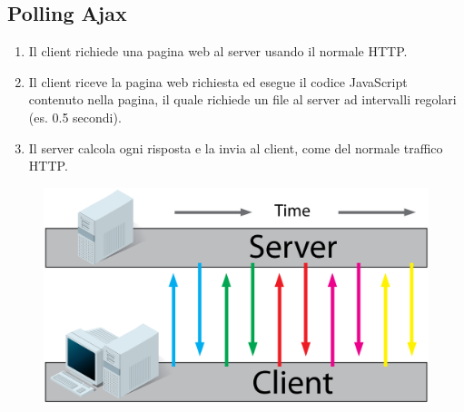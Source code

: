 \subsection{Polling Ajax}
\begin{enumerate}
	\item Il client richiede una pagina web al server usando il normale HTTP.
	\item Il client riceve la pagina web richiesta ed esegue il codice JavaScript contenuto nella pagina, il quale richiede un file al server ad intervalli regolari (es. 0.5 secondi).
	\item Il server calcola ogni risposta e la invia al client, come del normale traffico HTTP.
\end{enumerate}
\begin{figure}[h]
	\centering
	\includegraphics[scale=0.4]{Immagini/ajax_polling.png}
\end{figure}
